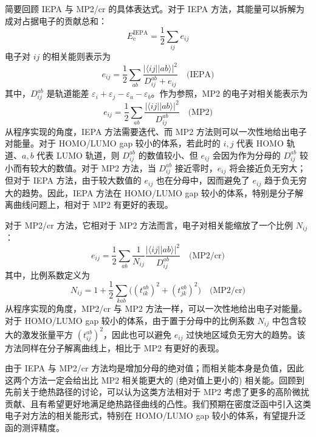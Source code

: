 简要回顾 IEPA 与 MP2/cr 的具体表达式。对于 IEPA 方法，其能量可以拆解为成对占据电子的贡献总和：
\begin{equation}
  E_\mathrm{c}^\mathrm{IEPA} = \frac{1}{2} \sum_{ij} e_{ij}
\end{equation}
电子对 $ij$ 的相关能则表示为
\begin{equation}
  e_{ij} = \frac{1}{2} \sum_{ab} \frac{|\langle ij || ab \rangle|^2}{D_{ij}^{ab} + e_{ij}} \quad \text{(IEPA)}
\end{equation}
其中，$D_{ij}^{ab}$ 是轨道能差 $\varepsilon_i + \varepsilon_j - \varepsilon_a - \varepsilon_b$。作为参照，MP2 的电子对相关能表示为
\begin{equation}
  e_{ij} = \frac{1}{2} \sum_{ab} \frac{|\langle ij || ab \rangle|^2}{D_{ij}^{ab}} \quad \text{(MP2)}
\end{equation}
从程序实现的角度，IEPA 方法需要迭代、而 MP2 方法则可以一次性地给出电子对能量。对于 HOMO/LUMO gap 较小的体系，若此时的 $i, j$ 代表 HOMO 轨道、$a, b$ 代表 LUMO 轨道，则 $D_{ij}^{ab}$ 的数值较小、但 $e_{ij}$ 会因为作为分母的 $D_{ij}^{ab}$ 较小而有较大的数值。对于 MP2 方法，当 $D_{ij}^{ab}$ 接近零时，$e_{ij}$ 将会接近负无穷大；但对于 IEPA 方法，由于较大数值的 $e_{ij}$ 也在分母中，因而避免了 $e_{ij}$ 趋于负无穷大的趋势。因此，IEPA 方法在 HOMO/LUMO gap 较小的体系，特别是分子解离曲线问题上，相对于 MP2 有更好的表现\cite{Zhang-Scheffler.NJP.2016, Zhang-Scheffler.PRL.2016}。

对于 MP2/cr 方法，它相对于 MP2 方法而言，电子对相关能缩放了一个比例 $N_{ij}$：
\begin{equation}
  \label{eq.2.eij-MP2cr}
  e_{ij} = \frac{1}{2} \sum_{ab} \frac{1}{N_{ij}} \frac{|\langle ij || ab \rangle|^2}{D_{ij}^{ab}} \quad \text{(MP2/cr)}
\end{equation}
其中，比例系数定义为
\begin{equation}
  \label{eq.2.Nij-MP2cr}
  N_{ij} = 1 + \frac{1}{2} \sum_{kab} \big( (t_{ik}^{ab})^2 + (t_{jk}^{ab})^2 \big) \quad \text{(MP2/cr)}
\end{equation}
从程序实现的角度，MP2/cr 与 MP2 方法一样，可以一次性地给出电子对能量。对于 HOMO/LUMO gap 较小的体系，由于置于分母中的比例系数 $N_{ij}$ 中包含较大的激发张量平方 $(t_{ij}^{ab})^2$，因此也可以避免 $e_{ij}$ 过快地区域负无穷大的趋势。该方法同样在分子解离曲线上，相比于 MP2 有更好的表现\cite{Dykstra-Davidson.IJQC.2000}。

由于 IEPA 与 MP2/cr 方法均是增加分母的绝对值；而相关能本身是负值，因此这两个方法一定会给出比 MP2 相关能更大的 (绝对值上更小的) 相关能。回顾到先前关于绝热路径的讨论，可以认为这类方法相对于 MP2 考虑了更多的高阶微扰贡献、且有希望更好地满足绝热路径曲线的凸性。我们预期在密度泛函中引入这类电子对方法的相关能形式，特别在 HOMO/LUMO gap 较小的体系，有望提升泛函的测评精度。

